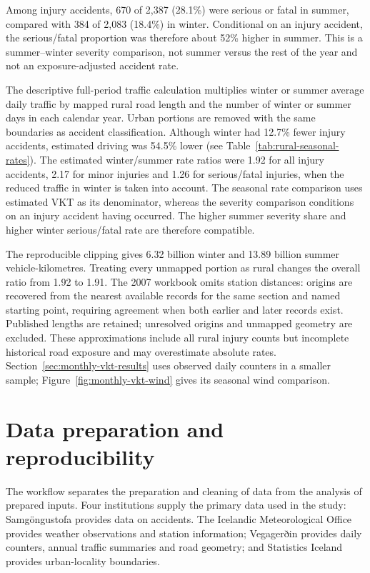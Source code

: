 Among injury accidents, 670 of 2,387 (28.1\%) were serious or fatal in summer, compared with 384 of 2,083 (18.4\%) in winter. Conditional on an injury accident, the serious/fatal proportion was therefore about 52\% higher in summer. This is a summer--winter severity comparison, not summer versus the rest of the year and not an exposure-adjusted accident rate.



The descriptive full-period traffic calculation multiplies winter or summer
average daily traffic by mapped rural road length and the number of winter or
summer days in each calendar year. Urban portions are removed with the same
boundaries as accident classification. Although winter had 12.7\% fewer injury
accidents, estimated driving was 54.5\% lower (see Table~\ref{tab:rural-seasonal-rates}). The estimated winter/summer rate
ratios were 1.92 for all injury accidents, 2.17 for minor injuries and 1.26 for
serious/fatal injuries, when the reduced traffic in winter is taken into account.
The seasonal rate comparison uses estimated VKT as its
denominator, whereas the severity comparison conditions on an injury accident
having occurred. The higher summer severity share and higher winter
serious/fatal rate are therefore compatible.

The reproducible clipping gives 6.32 billion winter and 13.89 billion summer vehicle-kilometres. Treating every unmapped portion as rural changes the overall ratio from 1.92 to 1.91. The 2007 workbook omits station distances: origins are recovered from the nearest available records for the same section and named starting point, requiring agreement when both earlier and later records exist. Published lengths are retained; unresolved origins and unmapped geometry are excluded. These approximations include all rural injury counts but incomplete historical road exposure and may overestimate absolute rates. Section~\ref{sec:monthly-vkt-results} uses observed daily counters in a smaller sample; Figure~\ref{fig:monthly-vkt-wind} gives its seasonal wind comparison.

\section{Data preparation and reproducibility}
The workflow separates the preparation and cleaning of data from the analysis of
prepared inputs. Four institutions supply the primary data used in the study:
Samgöngustofa provides data on accidents. The Icelandic Meteorological Office provides
weather observations and station information; Vegagerðin provides daily
counters, annual traffic summaries and road geometry; and Statistics Iceland
provides urban-locality boundaries.


